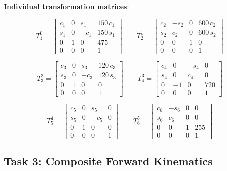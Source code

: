 \documentclass[12pt]{article}
\begin{document}
\textbf{Individual transformation matrices}:

\[
T_1^0 =
\begin{bmatrix}
    c_1 & 0 &  s_1 & 150\,c_1 \\
    s_1 & 0 & -c_1 & 150\,s_1 \\
    0   & 1 &  0   & 475      \\
    0   & 0 &  0   & 1
\end{bmatrix}
\qquad
T_2^1 =
\begin{bmatrix}
    c_2 & -s_2 & 0 & 600\,c_2 \\
    s_2 &  c_2 & 0 & 600\,s_2 \\
    0   &  0   & 1 & 0        \\
    0   &  0   & 0 & 1
\end{bmatrix}
\]

\[
T_3^2 =
\begin{bmatrix}
    c_3 & 0 &  s_3 & 120\,c_3 \\
    s_3 & 0 & -c_3 & 120\,s_3 \\
    0   & 1 &  0   & 0        \\
    0   & 0 &  0   & 1
\end{bmatrix}
\qquad
T_4^3 =
\begin{bmatrix}
    c_4 &  0 & -s_4 & 0   \\
    s_4 &  0 &  c_4 & 0   \\
    0   & -1 &  0   & 720 \\
    0   &  0 &  0   & 1
\end{bmatrix}
\]

\[
T_5^4 =
\begin{bmatrix}
    c_5 & 0 &  s_5 & 0 \\
    s_5 & 0 & -c_5 & 0 \\
    0   & 1 &  0   & 0 \\
    0   & 0 &  0   & 1
\end{bmatrix}
\qquad
T_6^5 =
\begin{bmatrix}
    c_6 & -s_6 & 0 & 0   \\
    s_6 &  c_6 & 0 & 0   \\
    0   &  0   & 1 & 255 \\
    0   &  0   & 0 & 1
\end{bmatrix}
\]

\subsection{Task 3: Composite Forward Kinematics}
\end{document}
